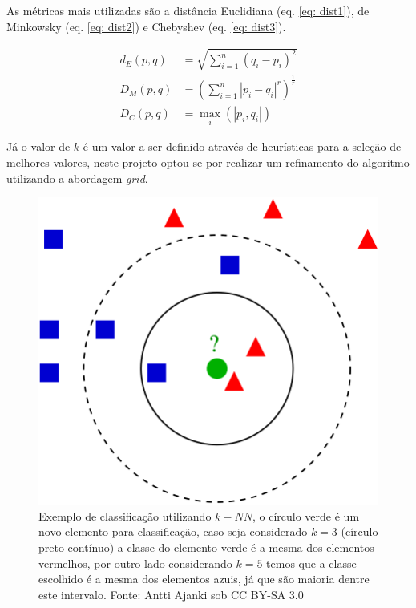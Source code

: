 \documentclass[
	article,			%
	11pt,				%
	oneside,			%
	a4paper,			%
	english,			%
	brazil,				%
	sumario=tradicional
	]{abntex2}
\begin{document}
As métricas mais utilizadas são a distância Euclidiana (eq. \ref{eq: dist1}), de Minkowsky (eq. \ref{eq: dist2}) e Chebyshev (eq. \ref{eq: dist3}).

\begin{align}
 \label{eq: dist1}
  d_E\left( p,q\right)&= \sqrt {\sum _{i=1}^{n}  \left( q_{i}-p_{i}\right)^2 } \\
  \label{eq: dist2}
  D_M\left( p,q\right)&= \left( \sum_{i=1}^{n} \left| p_i - q_i \right|^r \right)^{\frac{1}{r}} 
  \\
  \label{eq: dist3}
  D_C\left( p,q\right)&= \max_i(|p_i,q_i|) 
\end{align}

Já o valor de $k$ é um valor a ser definido através de heurísticas para a seleção de melhores valores, neste projeto optou-se por realizar um refinamento do algoritmo utilizando a abordagem \textit{grid}.

\begin{figure}[H]
 \centering
 \includegraphics[scale=0.2]{fig/knn_alg.png}
 \caption{Exemplo de classificação utilizando $k-NN$, o círculo verde é um novo elemento para classificação, caso seja considerado $k=3$ (círculo preto contínuo) a classe do elemento verde é a mesma dos elementos vermelhos, por outro lado considerando $k=5$ temos que a classe escolhido é a mesma dos elementos azuis, já que são maioria dentre este intervalo. Fonte: Antti Ajanki sob CC BY-SA 3.0}
 \label{fig:knn_alg}
\end{figure}
\end{document}
